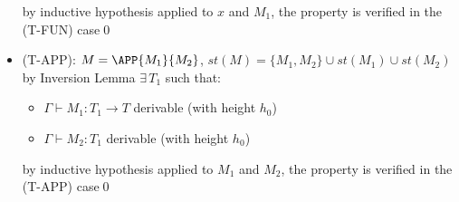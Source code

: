 \begin{itemize}
\begin{itemize}
	      \end{itemize}
	      by inductive hypothesis applied to $x$ and $M_1$, the property is verified
	      in the (T-FUN) case\qed
	\item (T-APP): $M = \APP{M_1}{M_2}$, $st(M) = \{ M_1, M_2 \} \cup st(M_1) \cup st(M_2)$
	      by Inversion Lemma $\exists\, T_1$ such that:
	      \begin{itemize}
		      \item $\Gamma \vdash M_1: T_1 \to T$ derivable (with height $h_0$)
		      \item $\Gamma \vdash M_2: T_1$ derivable (with height $h_0$)
	      \end{itemize}
	      by inductive hypothesis applied to $M_1$ and $M_2$, the property is verified in the
	      (T-APP) case\qed
\end{itemize}

